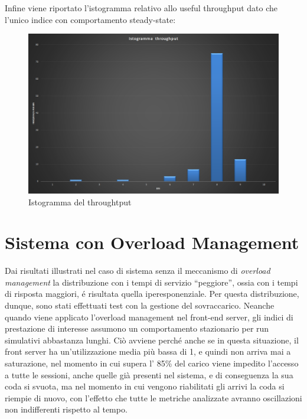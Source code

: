Infine viene riportato l'istogramma relativo allo useful throughput dato che 
l'unico
indice con comportamento steady-state:

\begin{figure}[H]
 \centering
 \includegraphics[scale=0.45]{img/istogramma.png}
 \caption[Istogramma del throughtput]{Istogramma del throughtput}
 \label{fig:Istogramma del throughtput}
\end{figure}

\section{Sistema con Overload Management}

Dai risultati illustrati nel caso di sistema senza il meccanismo di 
\textit{overload 
management} la distribuzione con i tempi di servizio ``peggiore'', ossia con i 
tempi
di risposta maggiori, \'e risultata quella iperesponenziale. 
Per questa distribuzione, dunque, sono stati effettuati test con la gestione del 
sovraccarico.
Neanche quando viene applicato l'overload management nel front-end server, gli 
indici di prestazione
di interesse assumono un comportamento stazionario per run simulativi abbastanza 
lunghi.
Ci\`o avviene perch\'e anche se in questa situazione, il front server ha 
un'utilizzazione media pi\`u bassa
di 1, e quindi non arriva mai a saturazione, nel momento in cui supera l' 85\% 
del carico viene impedito l'accesso
a tutte le sessioni, anche quelle gi\`a presenti nel sistema, e di conseguenza 
la sua coda si svuota, ma
nel momento in cui vengono riabilitati gli arrivi la coda si riempie di nuovo, 
con l'effetto che tutte le
metriche analizzate avranno oscillazioni non indifferenti rispetto al tempo.

